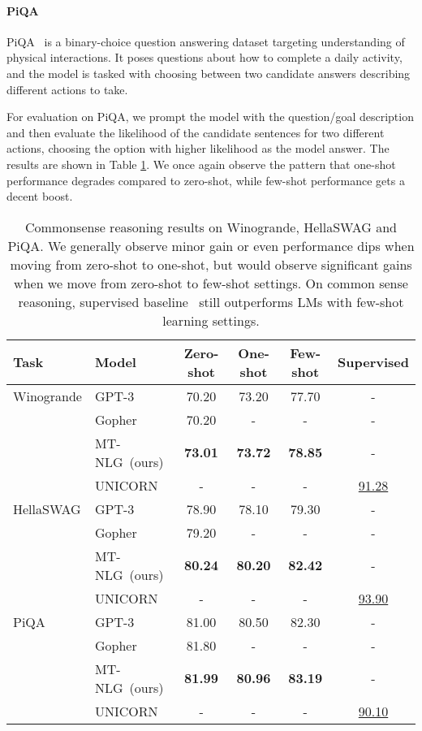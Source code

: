 \documentclass[11pt]{article}
\newcommand{\ours}{MT-NLG}
\begin{document}
\paragraph{PiQA} PiQA~\citep{Bisk2020PIQARA} is a binary-choice question answering dataset targeting understanding of physical interactions. It poses questions about how to complete a daily activity, and the model is tasked with choosing between two candidate answers describing different actions to take.

For evaluation on PiQA, we prompt the model with the question/goal description and then evaluate the likelihood of the candidate sentences for two different actions, choosing the option with higher likelihood as the model answer. The results are shown in Table \ref{tab:commonsense-perf}. We once again observe the pattern that one-shot performance degrades compared to zero-shot, while few-shot performance gets a decent boost. 



\begin{table}[t]
\centering
\small
\begin{tabular}{l l c c c c}
 \toprule
 \textbf{Task} & \textbf{Model} &  \textbf{Zero-shot}  &  \textbf{One-shot} &  \textbf{Few-shot} & \textbf{Supervised} \\
 \midrule
 Winogrande & GPT-3	&	70.20	&	73.20	&	77.70 & -	\\
        & Gopher	&	70.20	&	-	&	- & -	\\
        & \ours~(ours)  &   \textbf{73.01}   &   \textbf{73.72}   &   \textbf{78.85} & -  \\
        \cmidrule{2-6}
        & UNICORN  &   -   &   -   &   - &  \underline{91.28}  \\
 \midrule
 HellaSWAG & GPT-3	&	78.90	&	78.10	&	79.30 & -	\\
        & Gopher	&	79.20	&	-	&	- & -	\\
        & \ours~(ours)  &   \textbf{80.24}   &   \textbf{80.20}   &   \textbf{82.42} & -  \\
        \cmidrule{2-6}
        & UNICORN  &   -   &   -   &   - &  \underline{93.90}  \\
 \midrule
 PiQA   & GPT-3	&	81.00	&	80.50	&	82.30 & -	\\
        & Gopher	&	81.80	&	-	&	- & -	\\
        & \ours~(ours)  &   \textbf{81.99}   &  \textbf{80.96}   &   \textbf{83.19} & -  \\
        \cmidrule{2-6}
        & UNICORN  &   -   &   -   &   - &  \underline{90.10}  \\
        
 \bottomrule
\end{tabular}
\caption{Commonsense reasoning results on Winogrande, HellaSWAG and PiQA. We generally observe minor gain or even performance dips when moving from zero-shot to one-shot, but would observe significant gains when we move from zero-shot to few-shot settings. On common sense reasoning, supervised baseline~\citep{Lourie2021UNICORNOR} still outperforms LMs with few-shot learning settings.}
\label{tab:commonsense-perf}
\end{table}
\end{document}
